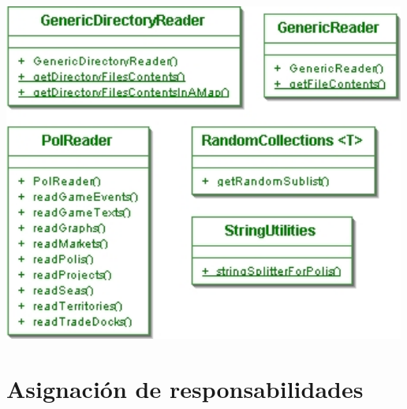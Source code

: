 \documentclass[11 pt]{book}
\begin{document}
\begin{center}
		    \includegraphics[width=500px]{design-uml/iteration7/utils.jpg}
		\end{center}
		
	\section{Asignación de responsabilidades}
		
		
		
		
		
		
		
		
		
		
		
		
		
		
		
		
		
		
		
		
		
		
		
		
\end{document}
